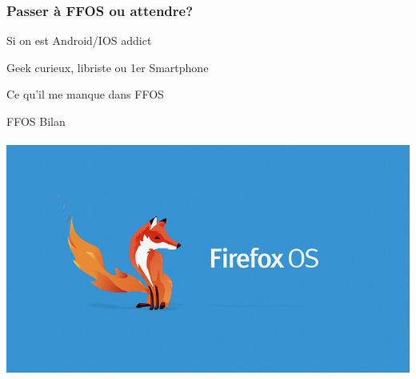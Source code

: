 \documentclass{beamer}
\begin{document}
\begin{frame}
\frametitle{Passer à FFOS ou attendre?}
\begin{block}{Si on est Android/IOS addict}
\end{block}

\begin{block}{Geek curieux, libriste ou 1er Smartphone}
\end{block}

\begin{block}{Ce qu'il me manque dans FFOS}
\end{block}
\end{frame}

\begin{frame}
\begin{center}
\Huge{FFOS Bilan}
\\~\\
\includegraphics[scale=0.3]{./images/firefox-os.jpg}
\end{center}
\end{frame}
\end{document}
